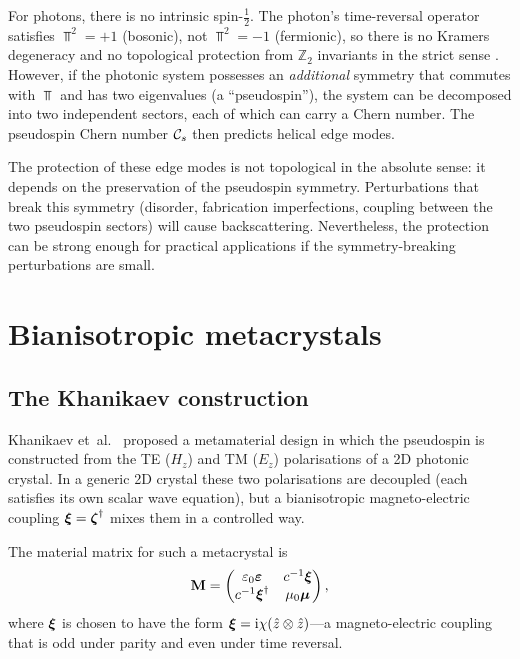 For photons, there is no intrinsic spin-$\frac{1}{2}$.  The photon's
time-reversal operator satisfies $\Top^2=+1$ (bosonic), not $\Top^2=-1$
(fermionic), so there is no Kramers degeneracy and no topological
protection from $\mathbb{Z}_2$ invariants in the strict sense
\cite{hsieh2008topological}.  However,
if the photonic system possesses an \emph{additional} symmetry that
commutes with $\Top$ and has two eigenvalues (a ``pseudospin''), the
system can be decomposed into two independent sectors, each of which
can carry a Chern number.  The pseudospin Chern number
$\mathcal{C}_s$ then predicts helical edge modes.

The protection of these edge modes is not topological in the absolute
sense: it depends on the preservation of the pseudospin symmetry.
Perturbations that break this symmetry (disorder, fabrication
imperfections, coupling between the two pseudospin sectors) will cause
backscattering.  Nevertheless, the protection can be strong enough for
practical applications if the symmetry-breaking perturbations are small.

\section{Bianisotropic metacrystals}
\label{sec:ch11-bianisotropic}

\subsection{The Khanikaev construction}
\label{sec:ch11-khanikaev}

Khanikaev et~al.\ \cite{unknownphotonic} proposed a metamaterial design in which the
pseudospin is constructed from the TE ($H_z$) and TM ($E_z$)
polarisations of a 2D photonic crystal.  In a generic 2D crystal these
two polarisations are decoupled (each satisfies its own scalar wave
equation), but a bianisotropic magneto-electric coupling
$\boldsymbol{\xi}=\boldsymbol{\zeta}^\dagger$ mixes them in a controlled way.

The material matrix for such a metacrystal is
\begin{equation}\label{eq:ch11-bianisotropic-M}
  \mathbf{M} = \begin{pmatrix}
    \varepsilon_0\boldsymbol{\varepsilon} & c^{-1}\boldsymbol{\xi} \\
    c^{-1}\boldsymbol{\xi}^\dagger & \mu_0\boldsymbol{\mu}
  \end{pmatrix},
\end{equation}
where $\boldsymbol{\xi}$ is chosen to have the form
$\boldsymbol{\xi}=\mathrm{i}\chi(\hat{z}\otimes\hat{z})$---a magneto-electric coupling
that is odd under parity and even under time reversal.


